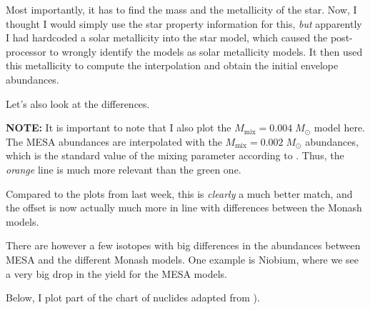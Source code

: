\documentclass[a4paper,10pt]{article}
\begin{document}
Most importantly, it has to find the mass and the metallicity of the star. Now, I thought I would simply use
the star property information for this, \emph{but} apparently I had hardcoded a solar metallicity into the
star model, which caused the post-processor to wrongly identify the models as solar metallicity models.
It then used this metallicity to compute the interpolation and obtain the initial envelope abundances.

\begin{figure}[ht]
    \centering
\end{figure}

Let's also look at the differences.

\begin{questionbox}{}{}
\textbf{\textcolor{keywordscolor}{NOTE:}}
    It is important to note that I also plot the \(M_\text{mix} = 0.004\; M_\odot \) model here. The MESA abundances are interpolated with the \(M_\text{mix} = 0.002\; M_\odot \) abundances, which is the standard value of the mixing parameter according to \citet{karakas2016}. Thus, the \emph{orange} line is much more relevant than the green one. 
\end{questionbox}

\begin{figure}[ht]
    \centering
\end{figure}

Compared to the plots from last week, this is \emph{clearly} a much better match,
and the offset is now actually much more in line with differences between the Monash models.

There are however a few isotopes with big differences in the abundances between MESA and the different Monash models.
One example is Niobium, where we see a very big drop in the yield for the MESA models.

\begin{figure}[ht]
    \centering
\end{figure}

Below, I plot part of the chart of nuclides adapted from \citet{wikimedia2022}).
\end{document}
